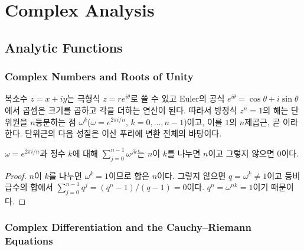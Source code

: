 \chapter{Complex Analysis}
\label{ch:complex}


\section{Analytic Functions}
\label{sec:holomorphic}

\subsection{Complex Numbers and Roots of Unity}

복소수 $z=x+iy$는 극형식 $z=re^{i\theta}$로 쓸 수 있고 Euler의 공식 $e^{i\theta}=\cos\theta+i\sin\theta$에서 곱셈은 크기를 곱하고 각을 더하는 연산이 된다. 따라서 방정식 $z^n=1$의 해는 단위원을 $n$등분하는 점 $\omega^k$($\omega=e^{2\pi i/n}$, $k=0,\dots,n-1$)이고, 이를 $1$의 $n$제곱근, 곧 이라 한다. 단위근의 다음 성질은 이산 푸리에 변환 전체의 바탕이다.

\begin{proposition}
\label{prop:roots-of-unity}
$\omega=e^{2\pi i/n}$과 정수 $k$에 대해 $\sum_{j=0}^{n-1}\omega^{jk}$는 $n$이 $k$를 나누면 $n$이고 그렇지 않으면 $0$이다.
\end{proposition}

\begin{proof}
$n$이 $k$를 나누면 $\omega^k=1$이므로 합은 $n$이다. 그렇지 않으면 $q=\omega^k\ne1$이고 등비급수의 합에서 $\sum_{j=0}^{n-1}q^j=(q^n-1)/(q-1)=0$이다. $q^n=\omega^{nk}=1$이기 때문이다.
\end{proof}

\subsection{Complex Differentiation and the Cauchy--Riemann Equations}


